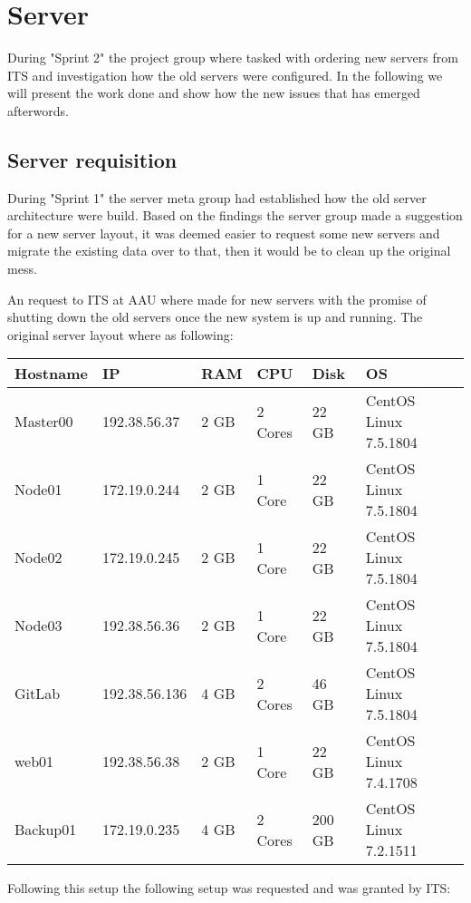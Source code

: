 \section{Server}\label{SEC:S2ServerWork}
During "Sprint 2" the project group where tasked with ordering new servers from ITS and investigation how the old servers were configured. 
In the following we will present the work done and show how the new issues that has emerged afterwords. 

\subsection{Server requisition}
During "Sprint 1" the server meta group had established how the old server architecture were build. 
Based on the findings the server group made a suggestion for a new server layout, it was deemed easier to request some new servers and migrate the existing data over to that, then it would be to clean up the original mess. 

An request to ITS at AAU where made for new servers with the promise of shutting down the old servers once the new system is up and running. The original server layout where as following:

\begin{table}[H]

\begin{tabular}{|l|l|l|l|l|l|}
\hline
Hostname & IP 			& RAM 	& CPU 		& Disk 	& OS 					\\ \hline
Master00 & 192.38.56.37 	& 2 GB 	& 2 Cores 	& 22 GB 	& CentOS Linux 7.5.1804 	\\ \hline
Node01 	& 172.19.0.244 	& 2 GB 	& 1 Core 	& 22 GB 	& CentOS Linux 7.5.1804 	\\ \hline
Node02	& 172.19.0.245	& 2 GB	& 1 Core		& 22 GB	& CentOS Linux 7.5.1804	\\ \hline
Node03	& 192.38.56.36	& 2 GB	& 1 Core 	& 22 GB	& CentOS Linux 7.5.1804 	\\ \hline
GitLab 	& 192.38.56.136	& 4 GB	& 2 Cores 	& 46 GB 	& CentOS Linux 7.5.1804 	\\ \hline
web01	& 192.38.56.38	& 2 GB	& 1 Core		& 22 GB 	& CentOS Linux 7.4.1708 	\\ \hline
Backup01	& 172.19.0.235	& 4 GB	& 2 Cores	& 200 GB & CentOS Linux 7.2.1511 	\\ \hline
\end{tabular}
\end{table}

Following this setup the following setup was requested and was granted by ITS:

